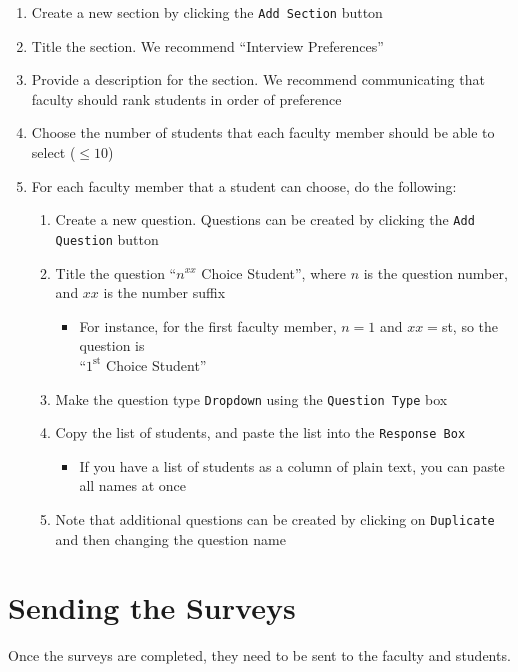 \begin{enumerate}
		
	\item Create a new section by clicking the \texttt{Add Section} button
	\item Title the section.  We recommend ``Interview Preferences''
	\item Provide a description for the section.  We recommend communicating that faculty should rank students in order of preference
	\item Choose the number of students that each faculty member should be able to select ($\le 10$)
	\item For each faculty member that a student can choose, do the following:
		\begin{enumerate}
			\item Create a new question. Questions can be created by clicking the \texttt{Add Question} button
			\item Title the question ``$n^{xx}$ Choice Student'', where $n$ is the question number, and $xx$ is the number suffix
				\begin{itemize}
					\item For instance, for the first faculty member, $n=1$ and $xx=$st, so the question is\\ ``$1^\text{st}$ Choice Student''
				\end{itemize}
			\item Make the question type \texttt{Dropdown} using the \texttt{Question Type} box
			\item Copy the list of students, and paste the list into the \texttt{Response Box}
				\begin{itemize}
					\item If you have a list of students as a column of plain text, you can paste all names at once
				\end{itemize}
			\item Note that additional questions can be created by clicking on \texttt{Duplicate} and then changing the question name
		\end{enumerate}

\end{enumerate}


%
%
\section{Sending the Surveys}

Once the surveys are completed, they need to be sent to the faculty and students.

